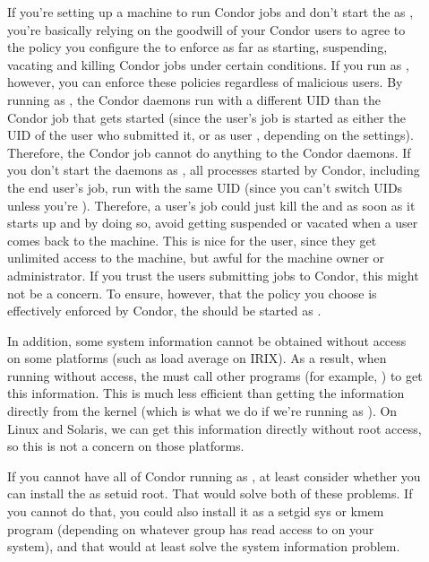\begin{description}

\item[] If you're setting up a machine to run Condor
   jobs and don't start the  as , you're basically
   relying on the goodwill of your Condor users to agree to the policy
   you configure the  to enforce as far as starting, suspending,
   vacating and killing Condor jobs under certain conditions.  If you
   run as , however, you can enforce these policies regardless of
   malicious users.  By running as , the Condor daemons run with a
   different UID than the Condor job that gets started (since the
   user's job is started as either the UID of the user who submitted
   it, or as user , depending on the 
   settings).  Therefore, the Condor job cannot do anything to the
   Condor daemons.  If you don't start the daemons as , all
   processes started by Condor, including the end user's job, run with
   the same UID (since you can't switch UIDs unless you're ).
   Therefore, a user's job could just kill the  and
    as soon as it starts up and by doing so, avoid
   getting suspended or vacated when a user comes back to the machine.
   This is nice for the user, since they get unlimited access to the
   machine, but awful for the machine owner or administrator.  If you
   trust the users submitting jobs to Condor, this might not be a
   concern.  To ensure, however, that the policy you choose is
   effectively enforced by Condor, the  should be
   started as .

   In addition, some system information cannot be obtained without
    access on some platforms (such as load average on IRIX).  As a
   result, when running without  access, the  must
   call other programs (for example, ) to get this
   information.  This is much less efficient than getting the
   information directly from the kernel (which is what we do if we're
   running as ).  On Linux and Solaris, we can get this
   information directly without root access, so this is not a concern
   on those platforms.

   If you cannot have all of Condor running as , at least consider
   whether you can install the  as setuid root.  That
   would solve both of these problems.  If you cannot do that, you
   could also install it as a setgid sys or kmem program (depending on
   whatever group has read access to  on your system),
   and that would at least solve the system information problem.


\end{description}
